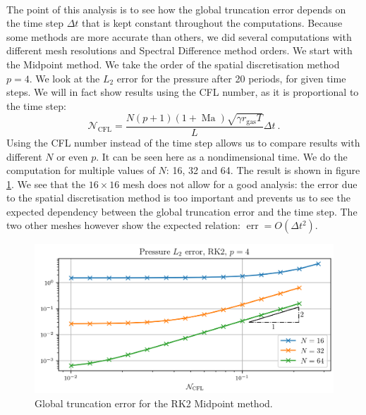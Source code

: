       \paragraph{}
      The point of this analysis is to see how the global truncation error depends on the time step $\Delta t$ that is kept constant throughout the computations.
      Because some methods are more accurate than others, we did several computations with different mesh resolutions and Spectral Difference method orders.
      We start with the Midpoint method.
      We take the order of the spatial discretisation method $p = 4$.
      We look at the $L_2$ error for the pressure after 20 periods, for given time steps.
      We will in fact show results using the CFL number, as it is proportional to the time step:
      \begin{equation}
        \mathcal{N}_\textrm{CFL} = \frac{N \left(p + 1\right) \left(1 + \operatorname{Ma}\right) \sqrt{\gamma r_\textrm{gas} T}}{L} \Delta t\ .
      \end{equation}
      Using the CFL number instead of the time step allows us to compare results with different $N$ or even $p$.
      It can be seen here as a nondimensional time.
      We do the computation for multiple values of $N$: 16, 32 and 64.
      The result is shown in figure \ref{fig:covo_rk2}.
      We see that the $16\times16$ mesh does not allow for a good analysis: the error due to the spatial discretisation method is too important and prevents us to see the expected dependency between the global truncation error and the time step.
      The two other meshes however show the expected relation: $\operatorname{err} = O\left(\Delta t^2\right)$.

      \begin{figure}
        \centering
        \includegraphics{figures/covo_rk2.png}
        \caption{Global truncation error for the RK2 Midpoint method.}
        \label{fig:covo_rk2}
      \end{figure}

